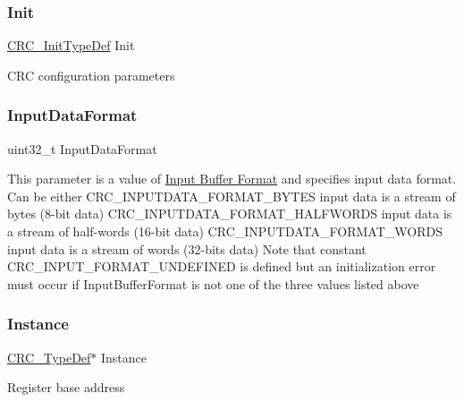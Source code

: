 \subsubsection{\texorpdfstring{Init}{Init}}
{\footnotesize\ttfamily \hyperlink{struct_c_r_c___init_type_def}{C\+R\+C\+\_\+\+Init\+Type\+Def} Init}

C\+RC configuration parameters \mbox{\label{struct_c_r_c___handle_type_def_a4edbae35710a51deebfbbbb329186fd3}} 
\subsubsection{\texorpdfstring{Input\+Data\+Format}{InputDataFormat}}
{\footnotesize\ttfamily uint32\+\_\+t Input\+Data\+Format}

This parameter is a value of \hyperlink{group___c_r_c___input___buffer___format}{Input Buffer Format} and specifies input data format. Can be either C\+R\+C\+\_\+\+I\+N\+P\+U\+T\+D\+A\+T\+A\+\_\+\+F\+O\+R\+M\+A\+T\+\_\+\+B\+Y\+T\+ES input data is a stream of bytes (8-\/bit data) C\+R\+C\+\_\+\+I\+N\+P\+U\+T\+D\+A\+T\+A\+\_\+\+F\+O\+R\+M\+A\+T\+\_\+\+H\+A\+L\+F\+W\+O\+R\+DS input data is a stream of half-\/words (16-\/bit data) C\+R\+C\+\_\+\+I\+N\+P\+U\+T\+D\+A\+T\+A\+\_\+\+F\+O\+R\+M\+A\+T\+\_\+\+W\+O\+R\+DS input data is a stream of words (32-\/bits data) Note that constant C\+R\+C\+\_\+\+I\+N\+P\+U\+T\+\_\+\+F\+O\+R\+M\+A\+T\+\_\+\+U\+N\+D\+E\+F\+I\+N\+ED is defined but an initialization error must occur if Input\+Buffer\+Format is not one of the three values listed above \mbox{\label{struct_c_r_c___handle_type_def_ad47f94224843c74bd605a4299349798a}} 
\subsubsection{\texorpdfstring{Instance}{Instance}}
{\footnotesize\ttfamily \hyperlink{struct_c_r_c___type_def}{C\+R\+C\+\_\+\+Type\+Def}$\ast$ Instance}

Register base address \mbox{\label{struct_c_r_c___handle_type_def_ad4cf225029dbefe8d3fe660c33b8bb6b}} 
